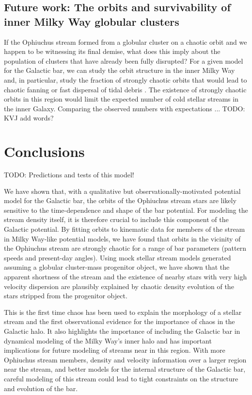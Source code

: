 \documentclass[letterpaper,12pt,preprint]{aastex}
\newcommand{\todo}[1]{{\color{red} TODO: #1}}
\begin{document}
\subsection{Future work: The orbits and survivability of inner Milky Way globular clusters}

If the Ophiuchus stream formed from a globular cluster on a chaotic orbit and we happen to be witnessing its final demise, what does this imply about the population of clusters that have already been fully disrupted? For a given model for the Galactic bar, we can study the orbit structure in the inner Milky Way and, in particular, study the fraction of strongly chaotic orbits that would lead to chaotic fanning or fast dispersal of tidal debris \citep{recent work by zotos or those greek peeps}. The existence of strongly chaotic orbits in this region would limit the expected number of cold stellar streams in the inner Galaxy. Comparing the observed numbers with expectations ... \todo{KVJ add words?}

\section{Conclusions}\label{sec:conclusions}

\todo{Predictions and tests of this model!}

We have shown that, with a qualitative but observationally-motivated potential model for the Galactic bar, the orbits of the Ophiuchus stream stars are likely sensitive to the time-dependence and shape of the bar potential. For modeling the stream density itself, it is therefore crucial to include this component of the Galactic potential. By fitting orbits to kinematic data for members of the stream in Milky Way-like potential models, we have found that orbits in the vicinity of the Ophiuchus stream are strongly chaotic for a range of bar parameters (pattern speeds and present-day angles). Using mock stellar stream models generated assuming a globular cluster-mass progenitor object, we have shown that the apparent shortness of the stream and the existence of nearby stars with very high velocity dispersion are plausibly explained by chaotic density evolution of the stars stripped from the progenitor object. 

This is the first time chaos has been used to explain the morphology of a stellar stream and the first observational evidence for the importance of chaos in the Galactic halo. It also highlights the importance of including the Galactic bar in dynamical modeling of the Milky Way's inner halo and has important implications for future modeling of streams near in this region. With more Ophiuchus stream members, density and velocity information over a larger region near the stream, and better models for the internal structure of the Galactic bar, careful modeling of this stream could lead to tight constraints on the structure and evolution of the bar.
\end{document}
